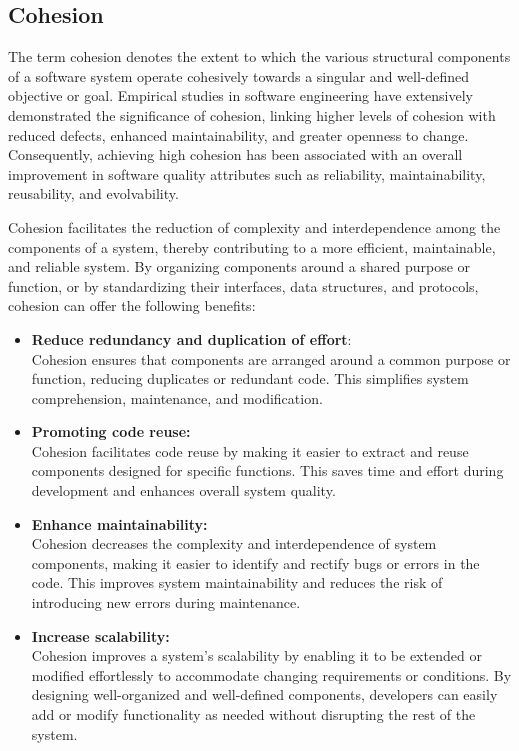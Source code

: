 \subsection{Cohesion} \label{subsubsec:on_cohesion}

The term cohesion denotes the extent to which the various structural components of a
software system operate cohesively towards a singular and well-defined objective or goal.
Empirical studies in software engineering have extensively demonstrated the significance
of cohesion, linking higher levels of cohesion with reduced defects, enhanced
maintainability, and greater openness to change. Consequently, achieving high cohesion has
been associated with an overall improvement in software quality attributes such as
reliability, maintainability, reusability, and evolvability.

Cohesion facilitates the reduction of complexity and interdependence among the components
of a system, thereby contributing to a more efficient, maintainable, and reliable system.
By organizing components around a shared purpose or function, or by standardizing their
interfaces, data structures, and protocols, cohesion can offer the following benefits:

\begin{itemize}
    \item \textbf{Reduce redundancy and duplication of effort}: \\
    Cohesion ensures that components are arranged around a common purpose or function,
    reducing duplicates or redundant code. This simplifies system comprehension,
    maintenance, and modification.
    \item \textbf{Promoting code reuse:}\\
    Cohesion facilitates code reuse by making it easier to extract and reuse components
    designed for specific functions. This saves time and effort during development and
    enhances overall system quality.
    \item \textbf{Enhance maintainability:}\\
    Cohesion decreases the complexity and interdependence of system components, making it
    easier to identify and rectify bugs or errors in the code. This improves system
    maintainability and reduces the risk of introducing new errors during maintenance.
    \item \textbf{Increase scalability:}\\
    Cohesion improves a system's scalability by enabling it to be extended or modified
    effortlessly to accommodate changing requirements or conditions. By designing
    well-organized and well-defined components, developers can easily add or modify
    functionality as needed without disrupting the rest of the system.  
\end{itemize}

